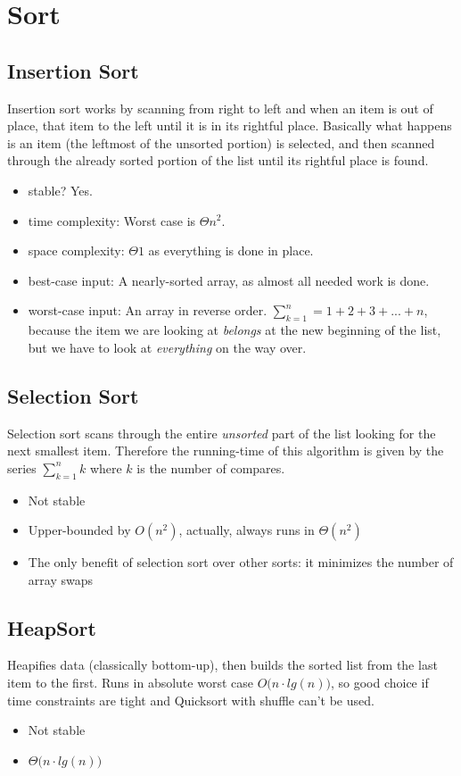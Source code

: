 \documentclass[12pt, letterpaper]{article}
\begin{document}
\section{Sort}
\subsection{Insertion Sort}
Insertion sort works by scanning from right to left and when an item is out of place,  that item to the left until it is in its rightful place.
\newline \newline \noindent
Basically what happens is an item (the leftmost of the unsorted portion) is selected, and then scanned through the already sorted portion of the list until its rightful place is found.
\begin{itemize}
\item stable? Yes.
\item time complexity:
Worst case is $\Theta n^2$.
\item space complexity: 
$\Theta 1$ as everything is done in place.
\item best-case input:
A nearly-sorted array, as almost all needed work is done. 
\item worst-case input: An array in reverse order. $\sum_{k=1}^{n} = 1 + 2 + 3 + ... + n$, because the item we are looking at \textit{belongs} at the new beginning of the list, but we have to look at \textit{everything} on the way over.
\end{itemize}
\subsection{Selection Sort}
Selection sort scans through the entire \emph{unsorted} part of the list looking for the next smallest item. Therefore the running-time of this algorithm is given by the series $\sum_{k=1}^n k$ where $k$ is the number of compares.
\begin{itemize}
\item Not stable
\item Upper-bounded by $O(n^2)$, actually, always runs in $\Theta(n^2)$
\item The only benefit of selection sort over other sorts: it minimizes the number of array swaps
\end{itemize}
\subsection{HeapSort}
Heapifies data (classically bottom-up), then builds the sorted list from the last item to the first.
\newline \newline \noindent
Runs in absolute worst case $O\big(n\cdot lg(n)\big)$, so good choice if time constraints are tight and Quicksort with shuffle can't be used.
\begin{itemize}
\item Not stable
\item $\Theta\big(n\cdot lg(n)\big)$
\end{itemize}
\end{document}
